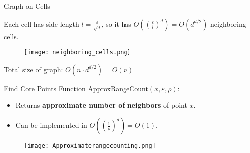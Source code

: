 \documentclass[aspectratio=169]{beamer}
\renewcommand{\epsilon}{\varepsilon}
\begin{document}
\begin{frame}{Graph on Cells}

    Each cell has side length $l =\frac{\epsilon}{\sqrt{d}}$, so it has $O\left(\left(\frac{\epsilon}{l}\right)^d\right)= O\left(d^{d/2}\right)$ neighboring cells.

    \vspace{0.3cm}

    \begin{figure}
        \centering
        \texttt{[image: neighboring\_cells.png]}
    \end{figure}

    \vspace{0.3cm}

    Total size of graph: $O\left(n\cdot d^{d/2}\right)=O(n)$
    
\end{frame}

\begin{frame}{Find Core Points}
    Function ApproxRangeCount$(x,\epsilon,\rho)$:
    
\vspace{0.3cm}
    \begin{minipage}{0.55\textwidth}
    \begin{itemize}
        \item Returns \textbf{approximate number of neighbors} of point $x$.
        \item Can be implemented in $O\left(\left(\frac{1}{\rho}\right)^d\right)=O(1)$.
    \end{itemize}
        
    \end{minipage}
    \hfill
    \begin{minipage}{0.4\textwidth}
        \begin{figure}
            \centering
            \texttt{[image: Approximaterangecounting.png]}
        \end{figure}
    \end{minipage}
    
    
\vspace{0.3cm}

\end{frame}
\end{document}

